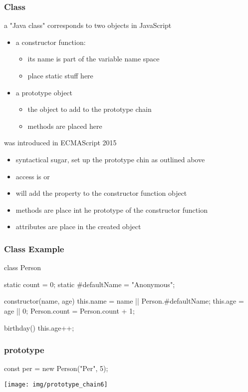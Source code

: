 \begin{frame}[fragile] \frametitle{Class}
a "Java class" corresponds to two objects in JavaScript
\begin{itemize}
  \item a constructor function:
  \begin{itemize}
    \item its name is part of the variable name space
    \item place static stuff here
  \end{itemize}
  \item a prototype object
  \begin{itemize}
    \item the object to add to the prototype chain
    \item methods are placed here
  \end{itemize}
\end{itemize}
\vspace{5mm}

 was introduced in ECMAScript 2015
\begin{itemize}
  \item syntactical sugar, set up the prototype chin as outlined above
  \item access is  or 
  \item {} will add the property to the constructor function object
  \item methods are place int he prototype of the constructor function
  \item attributes are place in the created object
\end{itemize}
\end{frame}
\begin{frame}[fragile] \frametitle{Class Example}
\begin{CodeBox}{}
class Person {
  static count = 0;
  static #defaultName = "Anonymous";

  constructor(name, age) {
    this.name = name || Person.#defaultName;
    this.age = age || 0;
    Person.count = Person.count + 1;
  }

  birthday() {
    this.age++;
  }
}
\end{CodeBox}
\end{frame}

\begin{frame}[fragile] \frametitle{prototype}
\begin{CodeBox}{}
  const per = new Person("Per", 5);
\end{CodeBox}
  \centering
  \texttt{[image: img/prototype\_chain6]}
\end{frame}


